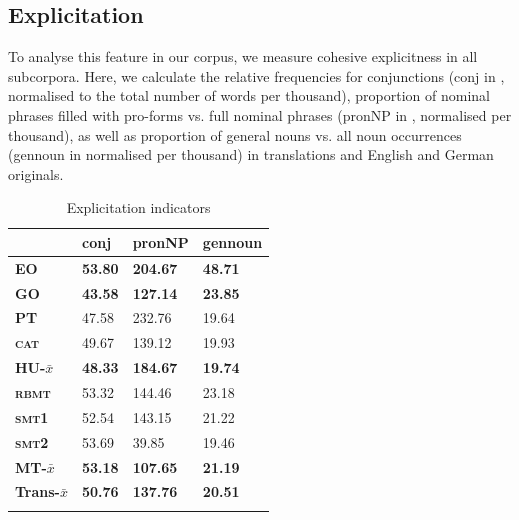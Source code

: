 \documentclass[output=paper]{LSP/langsci}
\begin{document}
\subsection{Explicitation}

To analyse this feature in our corpus, we measure cohesive explicitness in all subcorpora. Here, we calculate the relative frequencies for conjunctions (conj in , normalised to the total number of words per thousand), proportion of nominal phrases filled with pro-forms vs. full nominal phrases (pronNP in , normalised per thousand), as well as proportion of general nouns vs. all noun occurrences (gennoun in  normalised per thousand) in translations and English and German originals.

\begin{table}
     \centering
     \begin{tabular}{llll}
\lsptoprule
              & \textbf{conj}         & \textbf{pronNP}  & \textbf{gennoun} \\ \midrule
\textbf{EO}    & \textbf{53.80}     & \textbf{204.67} & \textbf{48.71} \\ 
\textbf{GO}    & \textbf{43.58}     & \textbf{127.14} & \textbf{23.85} \\ 
\textbf{PT}    & 47.58		        & 232.76          & 19.64 \\
\textbf{\textsc{cat}}   & 49.67		        & 139.12          & 19.93  \\ 
\textbf{HU-$\bar{x}$}    & \textbf{48.33}     & \textbf{184.67}   & \textbf{19.74}\\ 
\textbf{\textsc{rbmt}}  & 53.32		        & 144.46          & 23.18 \\
\textbf{\textsc{smt}1}  & 52.54		        & 143.15          & 21.22 \\
\textbf{\textsc{smt}2}  & 53.69		        & 39.85           & 19.46 \\ 
\textbf{MT-$\bar{x}$} & \textbf{53.18}  & \textbf{107.65}  & \textbf{21.19} \\ 
\textbf{Trans-$\bar{x}$} & \textbf{50.76}  & \textbf{137.76}  & \textbf{20.51} \\ 
\lspbottomrule
     \end{tabular}

 \caption{Explicitation indicators}
     \label{tab:4.3}
\end{table}
\end{document}
